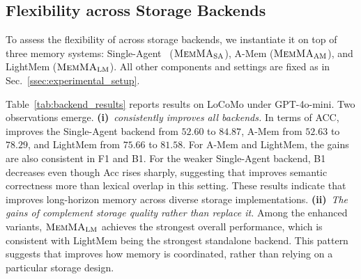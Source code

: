 \subsection{Flexibility across Storage Backends}
\label{ssec:flexibility_storage}
To assess the flexibility of \method across storage backends, we instantiate it on top of three memory systems: Single-Agent~\cite{yan2025memory} ($\textnormal{\textsc{MemMA}}_{\mathrm{SA}}$), 
A-Mem ($\textnormal{\textsc{MemMA}}_{\mathrm{AM}}$), and 
LightMem ($\textnormal{\textsc{MemMA}}_{\mathrm{LM}}$).
All other components and settings are fixed as in Sec.~\ref{ssec:experimental_setup}.


Table~\ref{tab:backend_results} reports results on LoCoMo under GPT-4o-mini.
Two observations emerge.
\textbf{(i)}~\emph{\method consistently improves all backends.}
In terms of ACC, \method improves the Single-Agent backend from $52.60$ to $84.87$, A-Mem from $52.63$ to $78.29$, and LightMem from $75.66$ to $81.58$.
For A-Mem and LightMem, the gains are also consistent in F1 and B1.
For the weaker Single-Agent backend, B1 decreases even though Acc rises sharply, suggesting that \method improves semantic correctness more than lexical overlap in this setting.
These results indicate that \method improves long-horizon memory across diverse storage implementations.
\textbf{(ii)}~\emph{The gains of \method complement storage quality rather than replace it.}
Among the enhanced variants, $\textnormal{\textsc{MemMA}}_{\mathrm{LM}}$ achieves the strongest overall performance, which is consistent with LightMem being the strongest standalone backend.
This pattern suggests that \method improves how memory is coordinated, rather than relying on a particular storage design.


